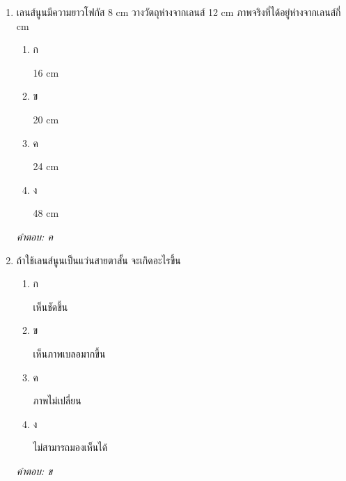 \documentclass[12pt]{article}
\begin{document}
\begin{enumerate}[label=\arabic*., itemsep=0.5\baselineskip, topsep=0.5\baselineskip, leftmargin=*]
\item เลนส์นูนมีความยาวโฟกัส 8 cm วางวัตถุห่างจากเลนส์ 12 cm ภาพจริงที่ได้อยู่ห่างจากเลนส์กี่ cm
\begin{enumerate}[label=\alph*)., itemsep=0.3\baselineskip, topsep=0.3\baselineskip]
\item ก\ 
\begin{minipage}[t]{0.9\linewidth}
\raggedright 16 cm
\end{minipage}
\item ข\ 
\begin{minipage}[t]{0.9\linewidth}
\raggedright 20 cm
\end{minipage}
\item ค\ 
\begin{minipage}[t]{0.9\linewidth}
\raggedright 24 cm
\end{minipage}
\item ง\ 
\begin{minipage}[t]{0.9\linewidth}
\raggedright 48 cm
\end{minipage}
\end{enumerate}
\vspace{-0.3\baselineskip}
\begin{small}
\textit{คำตอบ: ค}
\end{small}

\item ถ้าใช้เลนส์นูนเป็นแว่นสายตาสั้น จะเกิดอะไรขึ้น
\begin{enumerate}[label=\alph*)., itemsep=0.3\baselineskip, topsep=0.3\baselineskip]
\item ก\ 
\begin{minipage}[t]{0.9\linewidth}
\raggedright เห็นชัดขึ้น
\end{minipage}
\item ข\ 
\begin{minipage}[t]{0.9\linewidth}
\raggedright เห็นภาพเบลอมากขึ้น
\end{minipage}
\item ค\ 
\begin{minipage}[t]{0.9\linewidth}
\raggedright ภาพไม่เปลี่ยน
\end{minipage}
\item ง\ 
\begin{minipage}[t]{0.9\linewidth}
\raggedright ไม่สามารถมองเห็นได้
\end{minipage}
\end{enumerate}
\vspace{-0.3\baselineskip}
\begin{small}
\textit{คำตอบ: ข}
\end{small}


\end{enumerate}
\end{document}
